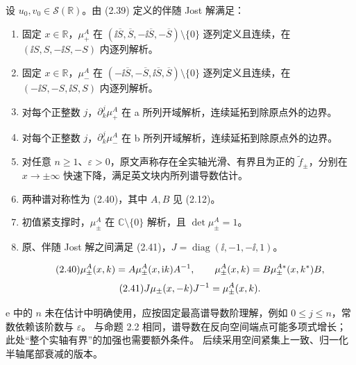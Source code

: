 \begin{paperpropositioncn*}
设 $u_0,v_0\in\mathcal S(\mathbb R)$。由 (2.39) 定义的伴随 Jost 解满足：
\begin{enumerate}[label=\alph*.]
\item 固定 $x\in\mathbb R$，$\mu_+^A$ 在 $(\ii\overline S,\overline S,-\ii\overline S,-\overline S)\setminus\{0\}$ 逐列定义且连续，在 $(\ii S,S,-\ii S,-S)$ 内逐列解析。
\item 固定 $x\in\mathbb R$，$\mu_-^A$ 在 $(-\ii\overline S,-\overline S,\ii\overline S,\overline S)\setminus\{0\}$ 逐列定义且连续，在 $(-\ii S,-S,\ii S,S)$ 内逐列解析。
\item 对每个正整数 $j$，$\partial_k^j\mu_+^A$ 在 a 所列开域解析，连续延拓到除原点外的边界。
\item 对每个正整数 $j$，$\partial_k^j\mu_-^A$ 在 b 所列开域解析，连续延拓到除原点外的边界。
\item 对任意 $n\geq1$、$\varepsilon>0$，原文声称存在全实轴光滑、有界且为正的 $\widetilde f_\pm$，分别在 $x\to\pm\infty$ 快速下降，满足英文块内所列谱导数估计。
\item 两种谱对称性为 (2.40)，其中 $A,B$ 见 (2.12)。
\item 初值紧支撑时，$\mu_\pm^A$ 在 $\mathbb C\setminus\{0\}$ 解析，且 $\det\mu_\pm^A=1$。
\item 原、伴随 Jost 解之间满足 (2.41)，$J=\operatorname{diag}(\ii,-1,-\ii,1)$。
\end{enumerate}
\end{paperpropositioncn*}
\begin{equation}
\originaleq{2.40}
\mu_\pm^A(x,k)=A\mu_\pm^A(x,\ii k)A^{-1},\qquad
\mu_\pm^A(x,k)=B\mu_\pm^{A*}(x,k^*)B,
\end{equation}
\begin{equation}
\originaleq{2.41}
J\mu_\pm(x,-k)J^{-1}=\mu_\pm^A(x,k).
\end{equation}
\begin{note}
e 中的 $n$ 未在估计中明确使用，应按固定最高谱导数阶理解，例如 $0\le j\le n$，常数依赖该阶数与 $\varepsilon$。
与命题 2.2 相同，谱导数在反向空间端点可能多项式增长；此处“整个实轴有界”的加强也需要额外条件。
后续采用空间紧集上一致、归一化半轴尾部衰减的版本。
\end{note}

